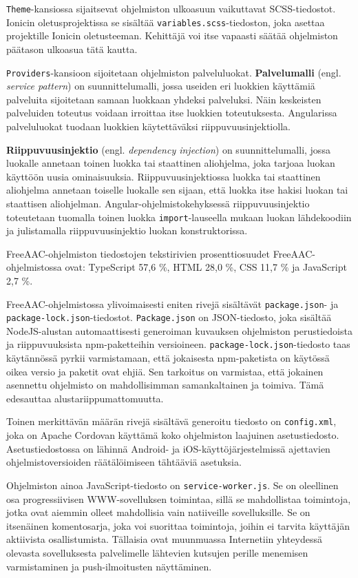 \documentclass[utf8]{gradu3}
\begin{document}
\texttt{Theme}-kansiossa sijaitsevat ohjelmiston ulkoasuun vaikuttavat SCSS-tiedostot. Ionicin oletusprojektissa se sisältää \texttt{variables.scss}-tiedoston, joka asettaa projektille Ionicin oletusteeman. Kehittäjä voi itse vapaasti säätää ohjelmiston päätason ulkoasua tätä kautta.

\texttt{Providers}-kansioon sijoitetaan ohjelmiston palveluluokat. \textbf{Palvelumalli} (engl. \textit{service pattern}) on suunnittelumalli, jossa useiden eri luokkien käyttämiä palveluita sijoitetaan samaan luokkaan yhdeksi palveluksi. Näin keskeisten palveluiden toteutus voidaan irroittaa itse luokkien toteutuksesta. Angularissa palveluluokat tuodaan luokkien käytettäväksi riippuvuusinjektiolla.

\textbf{Riippuvuusinjektio} (engl. \textit{dependency injection}) on suunnittelumalli, jossa luokalle annetaan toinen luokka tai staattinen aliohjelma, joka tarjoaa luokan käyttöön uusia ominaisuuksia. Riippuvuusinjektiossa luokka tai staattinen aliohjelma annetaan toiselle luokalle sen sijaan, että luokka itse hakisi luokan tai staattisen aliohjelman. Angular-ohjelmistokehyksessä riippuvuusinjektio toteutetaan tuomalla toinen luokka \texttt{import}-lauseella mukaan luokan lähdekoodiin ja julistamalla riippuvuusinjektio luokan konstruktorissa.

FreeAAC-ohjelmiston tiedostojen tekstirivien prosenttiosuudet FreeAAC-ohjelmistossa ovat: TypeScript 57,6 \%, HTML 28,0 \%, CSS 11,7 \% ja JavaScript 2,7 \%.

FreeAAC-ohjelmistossa ylivoimaisesti eniten rivejä sisältävät \texttt{package.json}- ja \texttt{package-lock.json}-tiedostot. \texttt{Package.json} on JSON-tiedosto, joka sisältää NodeJS-alustan automaattisesti generoiman kuvauksen ohjelmiston perustiedoista ja riippuvuuksista npm-paketteihin versioineen. \texttt{package-lock.json}-tiedosto taas käytännössä pyrkii varmistamaan, että jokaisesta npm-paketista on käytössä oikea versio ja paketit ovat ehjiä. Sen tarkoitus on varmistaa, että jokainen asennettu ohjelmisto on mahdollisimman samankaltainen ja toimiva. Tämä edesauttaa alustariippumattomuutta.

Toinen merkittävän määrän rivejä sisältävä generoitu tiedosto on \texttt{config.xml}, joka on Apache Cordovan käyttämä koko ohjelmiston laajuinen asetustiedosto. Asetustiedostossa on lähinnä Android- ja iOS-käyttöjärjestelmissä ajettavien ohjelmistoversioiden räätälöimiseen tähtääviä asetuksia.

Ohjelmiston ainoa JavaScript-tiedosto on \texttt{service-worker.js}. Se on oleellinen osa progressiivisen WWW-sovelluksen toimintaa, sillä se mahdollistaa toimintoja, jotka ovat aiemmin olleet mahdollisia vain natiiveille sovelluksille. Se on itsenäinen komentosarja, joka voi suorittaa toimintoja, joihin ei tarvita käyttäjän aktiivista osallistumista. Tällaisia ovat muunmuassa Internetiin yhteydessä olevasta sovelluksesta palvelimelle lähtevien kutsujen perille menemisen varmistaminen ja push-ilmoitusten näyttäminen.
\end{document}
